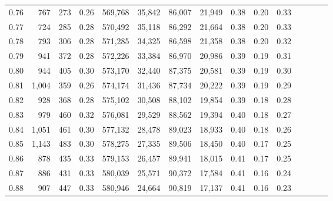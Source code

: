 \begin{tabular}{rrrcrrrrrrrrrrr}
0.76 &     767 &     273 &                                       0.26 &  569,768 &   35,842 &   86,007 &   21,949 &  0.38 &  0.20 &                         0.33 \\
0.77 &     724 &     285 &                                       0.28 &  570,492 &   35,118 &   86,292 &   21,664 &  0.38 &  0.20 &                         0.33 \\
0.78 &     793 &     306 &                                       0.28 &  571,285 &   34,325 &   86,598 &   21,358 &  0.38 &  0.20 &                         0.32 \\
0.79 &     941 &     372 &                                       0.28 &  572,226 &   33,384 &   86,970 &   20,986 &  0.39 &  0.19 &                         0.31 \\
0.80 &     944 &     405 &                                       0.30 &  573,170 &   32,440 &   87,375 &   20,581 &  0.39 &  0.19 &                         0.30 \\
0.81 &   1,004 &     359 &                                       0.26 &  574,174 &   31,436 &   87,734 &   20,222 &  0.39 &  0.19 &                         0.29 \\
0.82 &     928 &     368 &                                       0.28 &  575,102 &   30,508 &   88,102 &   19,854 &  0.39 &  0.18 &                         0.28 \\
0.83 &     979 &     460 &                                       0.32 &  576,081 &   29,529 &   88,562 &   19,394 &  0.40 &  0.18 &                         0.27 \\
0.84 &   1,051 &     461 &                                       0.30 &  577,132 &   28,478 &   89,023 &   18,933 &  0.40 &  0.18 &                         0.26 \\
0.85 &   1,143 &     483 &                                       0.30 &  578,275 &   27,335 &   89,506 &   18,450 &  0.40 &  0.17 &                         0.25 \\
0.86 &     878 &     435 &                                       0.33 &  579,153 &   26,457 &   89,941 &   18,015 &  0.41 &  0.17 &                         0.25 \\
0.87 &     886 &     431 &                                       0.33 &  580,039 &   25,571 &   90,372 &   17,584 &  0.41 &  0.16 &                         0.24 \\
0.88 &     907 &     447 &                                       0.33 &  580,946 &   24,664 &   90,819 &   17,137 &  0.41 &  0.16 &                         0.23 \\

\end{tabular}
